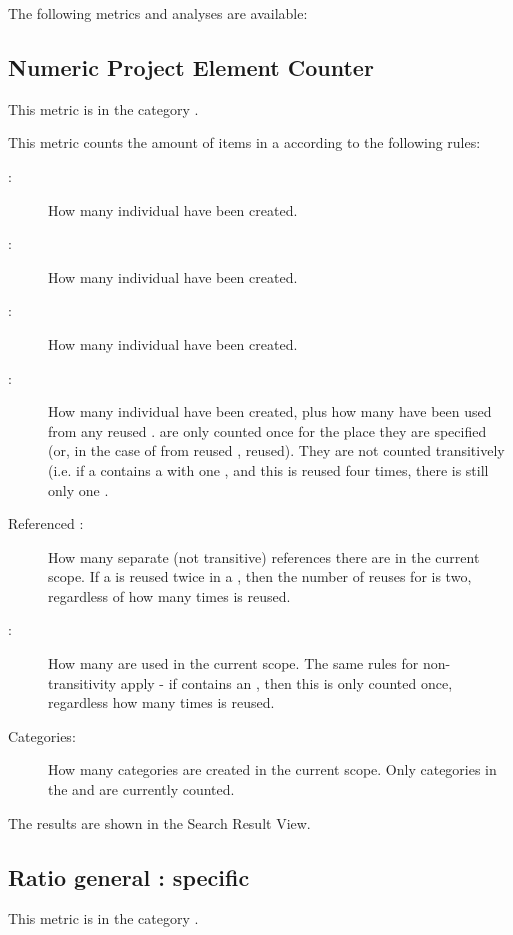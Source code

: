 The following metrics and analyses are available:

\subsection{Numeric Project Element Counter}
This metric is in the category .

This metric counts the amount of items in a \gdproject{} according to the following rules:

\begin{description}
\item [\gdcases{}:]{How many individual \gdcases{} have been created.}
\item [\gdsuites{}:]{How many individual \gdsuites{} have been created.}
\item[\gdjobs{}:]{How many individual \gdjobs{} have been created.}
\item[\gdsteps{}:]{How many individual \gdsteps{} have been created, plus how many \gdsteps{} have been used from any reused \gdprojects{}. \gdsteps{} are only counted once for the place they are specified (or, in the case of \gdsteps{} from reused \gdprojects{}, reused). They are not counted transitively (i.e. if a \gdproject{} contains a \gdcase{} with one \gdstep{}, and this \gdcase{} is reused four times, there is still only one \gdstep{}.}
\item[Referenced \gdcases{}:]{How many separate (not transitive) \gdcase{} references there are in the current scope. If a \gdcase{}  is reused twice in a \gdcase{} , then the number of reuses for  is two, regardless of how many times  is reused.}
\item[\gdehandlers{}:]{How many \gdehandlers{} are used in the current scope. The same rules for non-transitivity apply - if  contains an \gdehandler{}, then this \gdehandler{} is only counted once, regardless how many times  is reused.}
\item[Categories:]{How many categories are created in the current scope. Only categories in the \gdtestcasebrowser{} and \gdtestsuitebrowser{} are currently counted.} 
\end{description}

The results are shown in the Search Result View.

\subsection{Ratio general : specific}
This metric is in the category .

